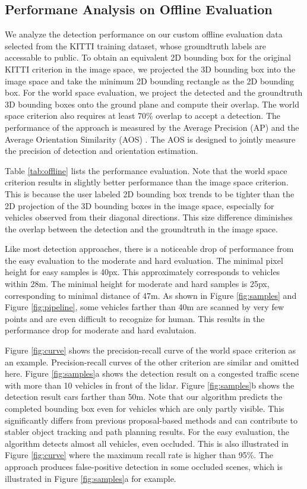 \documentclass[conference]{IEEEtran}
\begin{document}
\subsection{Performane Analysis on Offline Evaluation}
\label{sec:offline}
We analyze the detection performance on our custom offline evaluation data selected from the KITTI training dataset, whose groundtruth labels are accessable to public. To obtain an equivalent 2D bounding box for the original KITTI criterion in the image space, we projected the 3D bounding box into the image space and take the minimum 2D bounding rectangle as the 2D bounding box. For the world space evaluation, we project the detected and the groundtruth 3D bounding boxes onto the ground plane and compute their overlap. The world space criterion also requires at least 70\% overlap to accept a detection. The performance of the approach is measured by the Average Precision (AP) and the Average Orientation Similarity (AOS) \cite{Geiger2012}. The AOS is designed to jointly measure the precision of detection and orientation estimation.

Table \ref{tab:offline} lists the performance evaluation. Note that the world space criterion results in slightly better performance than the image space criterion. This is because the user labeled 2D bounding box trends to be tighter than the 2D projection of the 3D bounding boxes in the image space, especially for vehicles observed from their diagonal directions. This size difference diminishes the overlap between the detection and the groundtruth in the image space.

Like most detection approaches, there is a noticeable drop of performance from the easy evaluation to the moderate and hard evaluation. The minimal pixel height for easy samples is 40px. This approximately corresponds to vehicles within 28m. The minimal height for moderate and hard samples is 25px, corresponding to minimal distance of 47m. As shown in Figure \ref{fig:samples} and Figure \ref{fig:pipeline}, some vehicles farther than 40m are scanned by very few points and are even difficult to recognize for human. This results in the performance drop for moderate and hard evalutaion.

Figure \ref{fig:curve} shows the precision-recall curve of the world space criterion as an example. Precision-recall curves of the other criterion are similar and omitted here. Figure \ref{fig:samples}a shows the detection result on a congested traffic scene with more than 10 vehicles in front of the lidar.  Figure \ref{fig:samples}b shows the detection result cars farther than 50m. Note that our algorithm predicts the completed bounding box even for vehicles which are only partly visible. This significantly differs from previous proposal-based methods and can contribute to stabler object tracking and path planning results. For the easy evaluation, the algorithm detects almost all vehicles, even occluded. This is also illustrated in Figure \ref{fig:curve} where the maximum recall rate is higher than 95\%. The approach produces false-positive detection in some occluded scenes, which is illustrated in Figure \ref{fig:samples}a for example.
\end{document}
